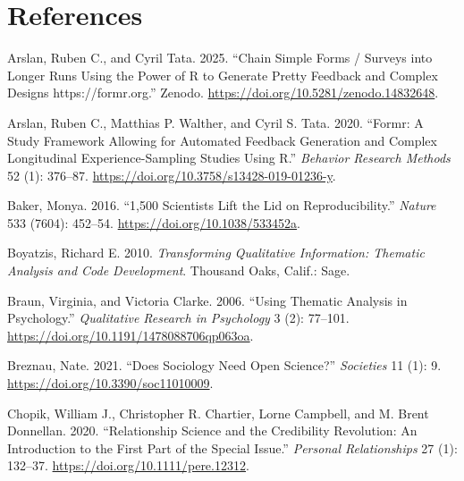 \documentclass[
  letterpaper,
  DIV=11,
  numbers=noendperiod]{scrartcl}
\newlength{\cslhangindent}
\newlength{\cslentryspacingunit} %
\newenvironment{CSLReferences}[2] %
 {%
  \setlength{\parindent}{0pt}
  \ifodd #1
  \let\oldpar\par
  \def\par{\hangindent=\cslhangindent\oldpar}
  \fi
  \setlength{\parskip}{#2\cslentryspacingunit}
 }%
 {}
\begin{document}
\hypertarget{references}{%
\section*{References}\label{references}}

\hypertarget{refs}{}
\begin{CSLReferences}{1}{0}
\leavevmode{}%
Arslan, Ruben C., and Cyril Tata. 2025. {``Chain Simple Forms / Surveys
into Longer Runs Using the Power of {R} to Generate Pretty Feedback and
Complex Designs {https://formr.org}.''} Zenodo.
\url{https://doi.org/10.5281/zenodo.14832648}.

\leavevmode{}%
Arslan, Ruben C., Matthias P. Walther, and Cyril S. Tata. 2020.
{``Formr: {A} Study Framework Allowing for Automated Feedback Generation
and Complex Longitudinal Experience-Sampling Studies Using {R}.''}
\emph{Behavior Research Methods} 52 (1): 376--87.
\url{https://doi.org/10.3758/s13428-019-01236-y}.

\leavevmode{}%
Baker, Monya. 2016. {``1,500 Scientists Lift the Lid on
Reproducibility.''} \emph{Nature} 533 (7604): 452--54.
\url{https://doi.org/10.1038/533452a}.

\leavevmode{}%
Boyatzis, Richard E. 2010. \emph{Transforming Qualitative Information:
Thematic Analysis and Code Development}. Thousand Oaks, Calif.: Sage.

\leavevmode{}%
Braun, Virginia, and Victoria Clarke. 2006. {``Using Thematic Analysis
in Psychology.''} \emph{Qualitative Research in Psychology} 3 (2):
77--101. \url{https://doi.org/10.1191/1478088706qp063oa}.

\leavevmode{}%
Breznau, Nate. 2021. {``Does {Sociology Need Open Science}?''}
\emph{Societies} 11 (1): 9. \url{https://doi.org/10.3390/soc11010009}.

\leavevmode{}%
Chopik, William J., Christopher R. Chartier, Lorne Campbell, and M.
Brent Donnellan. 2020. {``Relationship Science and the Credibility
Revolution: {An} Introduction to the First Part of the Special Issue.''}
\emph{Personal Relationships} 27 (1): 132--37.
\url{https://doi.org/10.1111/pere.12312}.


\end{CSLReferences}
\end{document}
